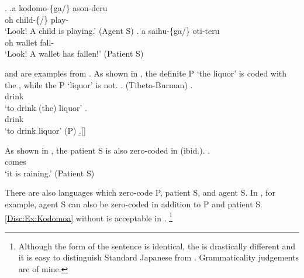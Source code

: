 \ex.\label{Disc:Ex:Kodomo}
	\ag.\label{Disc:Ex:Kodomoa}a kodomo-\{ga/\} ason-deru \\
		oh child-\{/\EM{\O}\} play- \\
		`Look! A child is playing.' \hfill{(Agent S)}
		\bg. a saihu-\{ga/\EM{\O}\} oti-teru \\
			oh wallet fall- \\
			`Look! A wallet has fallen!' \hfill{(Patient S)}

\Next and \NNext are examples from .
As shown in \Next[a],
the definite P `the liquor' is coded with the ,
while the  P `liquor' is not.
\ex.  (Tibeto-Burman)
 \ag.  {}  \\
	  drink \\
	`to drink (the) liquor'
 \bg.   \\
	 drink \\
	`to drink liquor' \hfill{(P)}
 \b.[] \hfill{\cite[p.\ 307]{matisoff81}}

As shown in \Next,
the  patient S is also zero-coded in  (ibid.).
	\exg. \footnotemark{}  \\
			 comes \\
			`it is raining.' \hfill{(Patient S)}

%
There are also languages which zero-code P, patient S, and agent S.
In , for example,
agent S can also be zero-coded in addition to P and patient S.
\ref{Disc:Ex:Kodomoa} without  is acceptable in  \cite[see also][]{nakagawa13m}.%
	\footnote{
	Although the form of the sentence is identical,
	the  is drastically different and it is easy to distinguish Standard Japanese from .
	Grammaticality judgements are of mine.
	}


